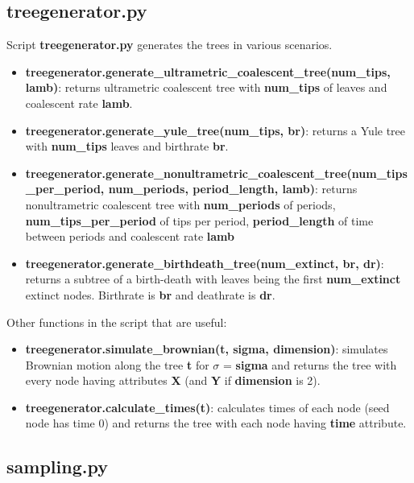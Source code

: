 \subsection*{treegenerator.py}

Script \textbf{treegenerator.py} generates the trees in various scenarios.
\begin{itemize}
\item \textbf{treegenerator.generate\_ultrametric\_coalescent\_tree(num\_tips, lamb)}: returns ultrametric coalescent tree with \textbf{num\_tips} of leaves and coalescent rate \textbf{lamb}.

\item \textbf{treegenerator.generate\_yule\_tree(num\_tips, br)}: returns a Yule tree with \textbf{num\_tips} leaves and birthrate \textbf{br}.

\item \textbf{treegenerator.generate\_nonultrametric\_coalescent\_tree(num\_tips\_per\_period, num\_periods, period\_length, lamb)}: returns nonultrametric coalescent tree with \textbf{num\_periods} of periods, \textbf{num\_tips\_per\_period} of tips per period, \textbf{period\_length} of time between periods and coalescent rate \textbf{lamb}

\item \textbf{treegenerator.generate\_birthdeath\_tree(num\_extinct, br, dr)}: returns a subtree of a birth-death with leaves being the first \textbf{num\_extinct} extinct nodes. Birthrate is \textbf{br} and deathrate is \textbf{dr}.
\end{itemize}

Other functions in the script that are useful:

\begin{itemize}
\item \textbf{treegenerator.simulate\_brownian(t, sigma, dimension)}: simulates Brownian motion along the tree \textbf{t} for $\sigma$ = \textbf{sigma} and returns the tree with every node having attributes \textbf{X} (and \textbf{Y} if \textbf{dimension} is 2).
\item \textbf{treegenerator.calculate\_times(t)}: calculates times of each node (seed node has time 0) and returns the tree with each node having \textbf{time} attribute.

\end{itemize}


\subsection*{sampling.py}

